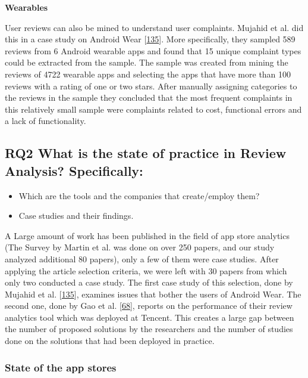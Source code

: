 \documentclass[]{book}
\providecommand{\tightlist}{%
  \setlength{\itemsep}{0pt}\setlength{\parskip}{0pt}}
\begin{document}
\textbf{Wearables}

User reviews can also be mined to understand user complaints. Mujahid et
al. did this in a case study on Android Wear
{[}\protect\hyperlink{ref-mujahid2017examining}{135}{]}. More
specifically, they sampled 589 reviews from 6 Android wearable apps and
found that 15 unique complaint types could be extracted from the sample.
The sample was created from mining the reviews of 4722 wearable apps and
selecting the apps that have more than 100 reviews with a rating of one
or two stars. After manually assigning categories to the reviews in the
sample they concluded that the most frequent complaints in this
relatively small sample were complaints related to cost, functional
errors and a lack of functionality.

\subsection{\texorpdfstring{\textbf{RQ2} What is the state of practice
in Review Analysis?
Specifically:}{RQ2 What is the state of practice in Review Analysis? Specifically:}}\label{rq2-what-is-the-state-of-practice-in-review-analysis-specifically}

\begin{itemize}
\tightlist
\item
  Which are the tools and the companies that create/employ them?
\item
  Case studies and their findings.
\end{itemize}

A Large amount of work has been published in the field of app store
analytics (The Survey by Martin et al. was done on over 250 papers, and
our study analyzed additional 80 papers), only a few of them were case
studies. After applying the article selection criteria, we were left
with 30 papers from which only two conducted a case study. The first
case study of this selection, done by Mujahid et al.
{[}\protect\hyperlink{ref-mujahid2017examining}{135}{]}, examines issues
that bother the users of Android Wear. The second one, done by Gao et
al. {[}\protect\hyperlink{ref-gao2018online}{68}{]}, reports on the
performance of their review analytics tool which was deployed at
Tencent. This creates a large gap between the number of proposed
solutions by the researchers and the number of studies done on the
solutions that had been deployed in practice.

\subsubsection{State of the app stores}\label{state-of-the-app-stores}
\end{document}
